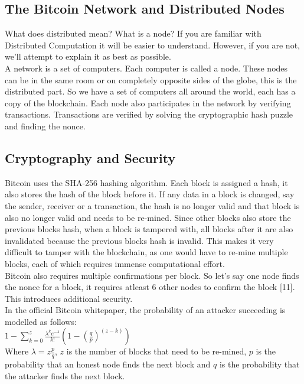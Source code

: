 \documentclass[11pt]{article} %
\begin{document}
\subsection{The Bitcoin Network and Distributed Nodes}{}
What does distributed mean? What is a node? If you are familiar with Distributed Computation it will be easier to understand. However, if you are not, we'll attempt to explain it as best as possible. \\

\noindent A network is a set of computers. Each computer is called a node. These nodes can be in the same room or on completely opposite sides of the globe, this is the distributed part. So we have a set of computers all around the world, each has a copy of the blockchain. Each node also participates in the network by verifying transactions. Transactions are verified by solving the cryptographic hash puzzle and finding the nonce.
\subsection{Cryptography and Security}{}
Bitcoin uses the SHA-256 hashing algorithm. Each block is assigned a hash, it also stores the hash of the block before it. If any data in a block is changed, say the sender, receiver or a transaction, the hash is no longer valid and that block is also no longer valid and needs to be re-mined. Since other blocks also store the previous blocks hash, when a block is tampered with, all blocks after it are also invalidated because the previous blocks hash is invalid. This makes it very difficult to tamper with the blockchain, as one would have to re-mine multiple blocks, each of which requires immense computational effort.\\

\noindent Bitcoin also requires multiple confirmations per block. So let's say one node finds the nonce for a block, it requires atleast 6 other nodes to confirm the block [11]. This introduces additional security.\\

\noindent In the official Bitcoin whitepaper, the probability of an attacker succeeding is modelled as follows:\\

$1 - \sum_{k=0}^{z} \frac{ \lambda^{k} e^{-\lambda} } {k!} (1 - ({\frac{q}{p}}) ^ {(z-k)})$\\

Where $\lambda = z \frac{p}{q}$, $z$ is the number of blocks that need to be re-mined, $p$ is the probability that an honest node finds the next block and $q$ is the probability that the attacker finds the next block.\\
\end{document}
